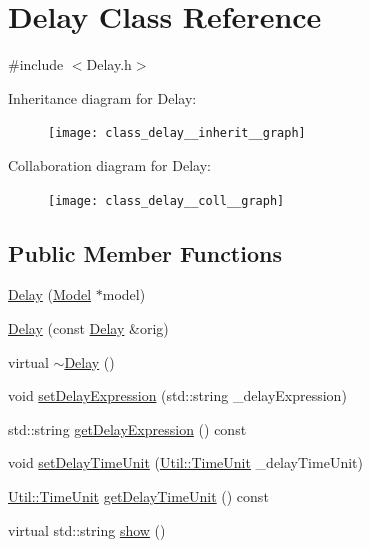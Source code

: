 \hypertarget{class_delay}{\section{Delay Class Reference}
\label{class_delay}
}


{\ttfamily \#include $<$Delay.\-h$>$}



Inheritance diagram for Delay\-:\nopagebreak
\begin{figure}[H]
\begin{center}
\leavevmode
\texttt{[image: class\_delay\_\_inherit\_\_graph]}
\end{center}
\end{figure}


Collaboration diagram for Delay\-:\nopagebreak
\begin{figure}[H]
\begin{center}
\leavevmode
\texttt{[image: class\_delay\_\_coll\_\_graph]}
\end{center}
\end{figure}
\subsection*{Public Member Functions}
\begin{DoxyCompactItemize}
\item 
\hyperlink{class_delay_a155ad32911b3289d968cca746f940520}{Delay} (\hyperlink{class_model}{Model} $\ast$model)
\item 
\hyperlink{class_delay_a5892fd8feb283f11980c0a9adb9befa7}{Delay} (const \hyperlink{class_delay}{Delay} \&orig)
\item 
virtual \hyperlink{class_delay_afee934130955d45563a6c5baaaf052d2}{$\sim$\-Delay} ()
\item 
void \hyperlink{class_delay_a683b53af607a424477acb946eb3afdfc}{set\-Delay\-Expression} (std\-::string \-\_\-delay\-Expression)
\item 
std\-::string \hyperlink{class_delay_a58559eda9ed25330d29b967c1bb0add5}{get\-Delay\-Expression} () const 
\item 
void \hyperlink{class_delay_abe7e89dba0974a81d00e6d2c0548fc1e}{set\-Delay\-Time\-Unit} (\hyperlink{class_util_aadbd82055afeaa7d4fb4da513de628ff}{Util\-::\-Time\-Unit} \-\_\-delay\-Time\-Unit)
\item 
\hyperlink{class_util_aadbd82055afeaa7d4fb4da513de628ff}{Util\-::\-Time\-Unit} \hyperlink{class_delay_a0561a6fdb4dd317952b5bb8d87b0c15f}{get\-Delay\-Time\-Unit} () const 
\item 
virtual std\-::string \hyperlink{class_delay_af8187e4515417b547dc22b5ee0a1f95d}{show} ()
\end{DoxyCompactItemize}

